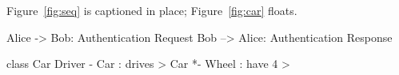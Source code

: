 \documentclass{scrartcl}
\begin{document}
Figure~\ref{fig:seq} is captioned in place; Figure~\ref{fig:car} floats.

\begin{plantuml}
Alice -> Bob: Authentication Request
Bob --> Alice: Authentication Response
\end{plantuml}

\begin{plantuml}
class Car
Driver - Car : drives >
Car *- Wheel : have 4 >
\end{plantuml}

\end{document}
